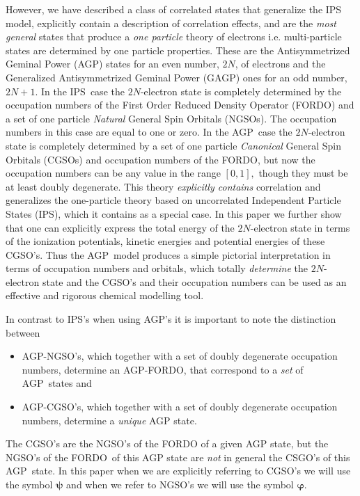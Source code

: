 \documentclass[aps,preprint]{revtex4}%
\begin{document}
However, we have described \cite{Weiner&ortiz04} a class of correlated states
that generalize the IPS model, explicitly contain a description of correlation
effects, and are the \emph{most general} states that produce a \emph{one
particle} theory of electrons i.e. multi-particle states are determined by one
particle properties. These are the Antisymmetrized Geminal Power (AGP) states
for an even number, $2N$, of electrons and the Generalized Antisymmetrized
Geminal Power (GAGP) ones for an odd number, $2N+1$. In the IPS\ case the
$2N$-electron state is completely determined by the occupation numbers of the
First Order Reduced Density Operator (FORDO) and a set of one particle
\emph{Natural }General Spin Orbitals (NGSOs). The occupation numbers in this
case are equal to one or zero. In the AGP\ case the $2N$-electron state is
completely determined by a set of one particle \emph{Canonical }General Spin
Orbitals (CGSOs) and occupation numbers of the FORDO, but now the occupation
numbers can be any value in the range $\left[  0,1\right]  ,$ though they must
be at least doubly degenerate. This theory \emph{explicitly contains}
correlation and generalizes the one-particle theory based on uncorrelated
Independent Particle States (IPS), which it contains as a special case. In
this paper we further show that one can explicitly express the total energy of
the $2N$-electron state in terms of the ionization potentials, kinetic
energies and potential energies of these CGSO's. Thus the AGP\ model produces
a simple pictorial interpretation in terms of occupation numbers and orbitals,
which totally \emph{determine} the $2N$-electron state and the CGSO's and
their occupation numbers can be used as an effective and rigorous chemical
modelling tool.

In contrast to IPS's when using AGP's it is important to note the distinction between

\begin{itemize}
\item AGP-NGSO's, which together with a set of doubly degenerate occupation
numbers, determine an AGP-FORDO, that correspond to a \emph{set }of
AGP\ states and

\item AGP-CGSO's, which together with a set of doubly degenerate occupation
numbers, determine a \emph{unique} AGP state.
\end{itemize}

The CGSO's are the NGSO's of the FORDO of a given AGP state, but the NGSO's of
the FORDO\ of this AGP state are \emph{not }in general the CSGO's of this
AGP\ state. In this paper when we are explicitly referring to CGSO's we will
use the symbol $\mathbf{\psi}$ and when we refer to NGSO's we will use the
symbol $\mathbf{\varphi.}$
\end{document}
